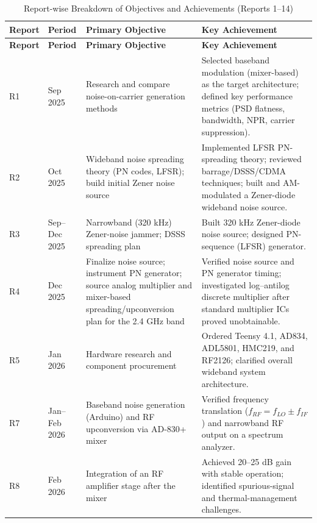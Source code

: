 \documentclass[12pt,a4paper]{report}
\begin{document}
	\begin{longtable}{|p{1.5cm}|p{2cm}|p{5cm}|p{6cm}|}
		\caption{Report-wise Breakdown of Objectives and Achievements (Reports 1--14)}
		\label{tab:reports} \\
		\hline
		\textbf{Report} & \textbf{Period} & \textbf{Primary Objective} & \textbf{Key Achievement} \\
		\hline
		\endfirsthead
		
		\hline
		\textbf{Report} & \textbf{Period} & \textbf{Primary Objective} & \textbf{Key Achievement} \\
		\hline
		\endhead
		
		R1 & Sep 2025 &
		Research and compare noise-on-carrier generation methods &
		Selected baseband modulation (mixer-based) as the target architecture; defined key performance metrics (PSD flatness, bandwidth, NPR, carrier suppression). \\
		\hline
		
		R2 & Oct 2025 &
		Wideband noise spreading theory (PN codes, LFSR); build initial Zener noise source &
		Implemented LFSR PN-spreading theory; reviewed barrage/DSSS/CDMA techniques; built and AM-modulated a Zener-diode wideband noise source. \\
		\hline
		
		R3 & Sep--Dec 2025 &
		Narrowband (320 kHz) Zener-noise jammer; DSSS spreading plan &
		Built 320 kHz Zener-diode noise source; designed PN-sequence (LFSR) generator. \\
		\hline
		
		R4 & Dec 2025 &
		Finalize noise source; instrument PN generator; source analog multiplier and mixer-based spreading/upconversion plan for the 2.4 GHz band &
		Verified noise source and PN generator timing; investigated log--antilog discrete multiplier after standard multiplier ICs proved unobtainable. \\
		\hline
		
		R5 & Jan 2026 &
		Hardware research and component procurement &
		Ordered Teensy 4.1, AD834, ADL5801, HMC219, and RF2126; clarified overall wideband system architecture. \\
		\hline
		
		R7 & Jan--Feb 2026 &
		Baseband noise generation (Arduino) and RF upconversion via AD-830+ mixer &
		Verified frequency translation ($f_{RF}=f_{LO}\pm f_{IF}$) and narrowband RF output on a spectrum analyzer. \\
		\hline
		
		R8 & Feb 2026 &
		Integration of an RF amplifier stage after the mixer &
		Achieved 20--25 dB gain with stable operation; identified spurious-signal and thermal-management challenges. \\
		\hline
		

\end{longtable}
\end{document}

